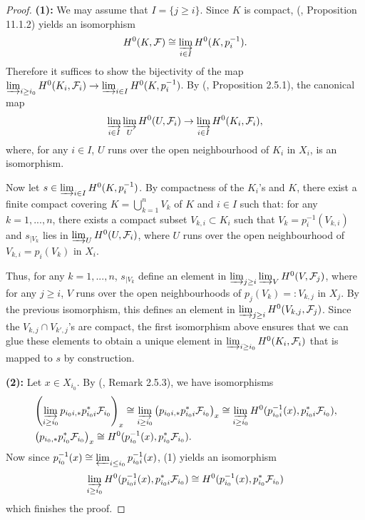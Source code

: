 \documentclass [11pt,reqno]{amsart}
\newcommand{\1}{\mathmybb{1}}
\def\cF{{\mathcal{F}}}
\begin{document}
\begin{proof}
\textbf{(1):} We may assume that $I=\{j\geq i\}$. Since $K$ is compact, (\cite{Schapira23}, Proposition 11.1.2) yields an isomorphism
\begin{align*}
H^{0}(K,\cF) \cong \displaystyle\varinjlim_{i\in I} H^{0}(K,p_{i}^{-1}).
\end{align*}
Therefore it suffices to show the bijectivity of the map $\varinjlim_{i\geq i_{0}}H^{0}(K_{i},\cF_{i})\to\varinjlim_{i\in I} H^{0}(K,p_{i}^{-1})$. By (\cite{KS90}, Proposition 2.5.1), the canonical map
\begin{align*}
\displaystyle\varinjlim_{i\in I}\varinjlim_{U} H^{0}(U,\cF_{i}) \to \varinjlim_{i\in I}H^{0}(K_{i},\cF_{i}),
\end{align*}
where, for any $i\in I$, $U$ runs over the open neighbourhood of $K_{i}$ in $X_{i}$, is an isomorphism. 

Now let $s\in \varinjlim_{i\in I} H^{0}(K,p_{i}^{-1})$. By compactness of the $K_{i}$'s and $K$, there exist a finite compact covering $K=\bigcup_{k=1}^{n}V_{k}$ of $K$ and $i\in I$ such that: for any $k=1,...,n$, there exists a compact subset $V_{k,i}\subset K_{i}$ such that $V_{k}=p_{i}^{-1}(V_{k,i})$ and $s_{|V_{k}}$ lies in $\varinjlim_{U}H^{0}(U,\cF_{i})$, where $U$ runs over the open neighbourhood of $V_{k,i}=p_{i}(V_{k})$ in $X_{i}$. 

Thus, for any $k=1,...,n$, $s_{|V_{k}}$ define an element in $\varinjlim_{j\geq i}\varinjlim_{V}H^{0}(V,\cF_{j})$, where for any $j\geq i$, $V$ runs over the open neighbourhoods of $p_{j}(V_{k})=:V_{k,j}$ in $X_{j}$. By the previous isomorphism, this defines an element in $\varinjlim_{j\geq i}H^{0}(V_{k,j},\cF_{j})$.  Since the $V_{k,j}\cap V_{k',j}$'s are compact, the first isomorphism above ensures that we can glue these elements to obtain a unique element in $\varinjlim_{i\geq i_{0}}H^{0}(K_{i},\cF_{i})$ that is mapped to $s$ by construction. 

\textbf{(2):} Let $x\in X_{i_{0}}$. By (\cite{KS90}, Remark 2.5.3), we have isomorphisms
\begin{align*}
&\left(\displaystyle\varinjlim_{i\geq i_{0}}p_{i_{0}i,\ast}p_{i_{0}i}^{\ast}\cF_{i_{0}}\right)_{x}\cong \varinjlim_{i\geq i_{0}} \left(p_{i_{0}i,\ast}p_{i_{0}i}^{\ast}\cF_{i_{0}}\right)_{x} \cong \varinjlim_{i\geq i_{0}}H^{0}(p_{i_{0}i}^{-1}(x),p_{i_{0}i}^{\ast}\cF_{i_{0}}),\\
&\left(p_{i_{0},\ast}p_{i_{0}}^{\ast}\cF_{i_{0}}\right)_{x}\cong H^{0}(p_{i_{0}}^{-1}(x),p_{i_{0}}^{\ast}\cF_{i_{0}}).
\end{align*}
Now since $p_{i_{0}}^{-1}(x)\cong \varprojlim_{i\leq i_{0}}p_{i_{0}i}^{-1}(x)$, (1) yields an isomorphism
\begin{align*}
\displaystyle\varinjlim_{i\geq i_{0}}H^{0}(p_{i_{0}i}^{-1}(x),p_{i_{0}i}^{\ast}\cF_{i_{0}})\cong H^{0}(p_{i_{0}}^{-1}(x),p_{i_{0}}^{\ast}\cF_{i_{0}})
\end{align*}
which finishes the proof.
\end{proof}
\end{document}
